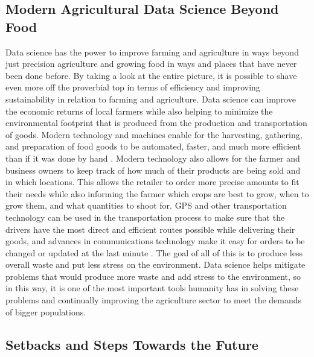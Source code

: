 \documentclass[sigconf]{acmart}
\begin{document}
\subsection{Modern Agricultural Data Science Beyond Food}

Data science has the power to improve farming and agriculture in ways beyond just precision agriculture and growing food in ways and places that have never been done before. By taking a look at the entire picture, it is possible to shave even more off the proverbial top in terms of efficiency and improving sustainability in relation to farming and agriculture. Data science can improve the economic returns of local farmers while also helping to minimize the environmental footprint that is produced from the production and transportation of goods. Modern technology and machines enable for the harvesting, gathering, and preparation of food goods to be automated, faster, and much more efficient than if it was done by hand \cite{wang2006}. Modern technology also allows for the farmer and business owners to keep track of how much of their products are being sold and in which locations. This allows the retailer to order more precise amounts to fit their needs while also informing the farmer which crops are best to grow, when to grow them, and what quantities to shoot for. GPS and other transportation technology can be used in the transportation process to make sure that the drivers have the most direct and efficient routes possible while delivering their goods, and advances in communications technology make it easy for orders to be changed or updated at the last minute \cite{trauger2009}. The goal of all of this is to produce less overall waste and put less stress on the environment. Data science helps mitigate problems that would produce more waste and add stress to the environment, so in this way, it is one of the most important tools humanity has in solving these problems and continually improving the agriculture sector to meet the demands of bigger populations.

\subsection{Setbacks and Steps Towards the Future}
\end{document}

